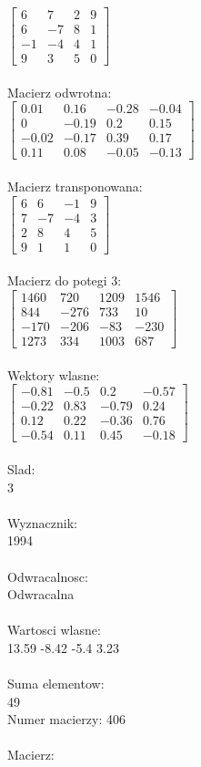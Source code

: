 \documentclass[a4paper,12pt]{article}
\begin{document}
$\begin{bmatrix} 6&7&2&9\\6&-7&8&1\\-1&-4&4&1\\9&3&5&0 \end{bmatrix}$
\\
\\
Macierz odwrotna:\\

$\begin{bmatrix} 0.01&0.16&-0.28&-0.04\\0&-0.19&0.2&0.15\\-0.02&-0.17&0.39&0.17\\0.11&0.08&-0.05&-0.13 \end{bmatrix}$
\\
\\
Macierz transponowana:\\

$\begin{bmatrix} 6&6&-1&9\\7&-7&-4&3\\2&8&4&5\\9&1&1&0 \end{bmatrix}$
\\
\\
Macierz do potegi 3:\\

$\begin{bmatrix} 1460&720&1209&1546\\844&-276&733&10\\-170&-206&-83&-230\\1273&334&1003&687 \end{bmatrix}$
\\
\\
Wektory wlasne:\\

$\begin{bmatrix} -0.81&-0.5&0.2&-0.57\\-0.22&0.83&-0.79&0.24\\0.12&0.22&-0.36&0.76\\-0.54&0.11&0.45&-0.18 \end{bmatrix}$
\\
\\
Slad:\\
3
\\
\\
Wyznacznik:\\
1994
\\
\\
Odwracalnosc:\\
Odwracalna
\\
\\
Wartosci wlasne:\\
13.59 -8.42 -5.4 3.23
\\
\\
Suma elementow:\\
49
\\
\newpage
Numer macierzy:
406
\\
\\
Macierz:\\
\end{document}
